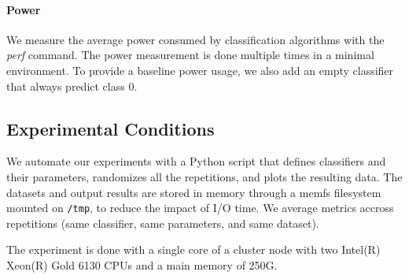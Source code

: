\paragraph{Power} We measure the average power
consumed by classification algorithms with the
\textit{perf} command. The power measurement is
done multiple times in a minimal environment. To
provide a baseline power usage, we also add an
empty classifier that always predict class 0.

\subsection{Experimental Conditions}
We automate our experiments with a Python script that defines
classifiers and their parameters, randomizes all
the repetitions, and plots the
resulting data. The datasets and output results are stored in memory
through a memfs filesystem mounted on \texttt{/tmp}, to reduce the impact of I/O time.
We average metrics accross repetitions (same classifier, same parameters, and
same dataset).

The experiment is done with a single core of a
cluster node with two Intel(R) Xeon(R)
Gold 6130 CPUs and a main memory of 250G.

